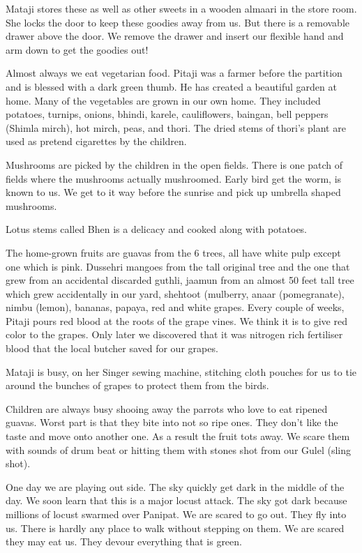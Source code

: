 Mataji stores these as well as other sweets in a wooden almaari in the
store room. She locks the door to keep these goodies away from us. But
there is a removable drawer above the door. We remove the drawer and
insert our flexible hand and arm down to get the goodies out! 

Almost always we eat vegetarian food. Pitaji was a farmer before the
partition and is blessed with a dark green thumb. He has created
a beautiful garden at home. Many of the vegetables are grown in our own
home. They included potatoes, turnips, onions, bhindi, karele,
cauliflowers, baingan, bell peppers (Shimla mirch), hot mirch, peas, and
thori. The dried stems of thori’s plant are used as pretend cigarettes by
the children. 

Mushrooms are picked by the children in the open fields. There is one
patch of fields where the mushrooms actually mushroomed. Early bird get
the worm, is known to us. We get to it way before the sunrise and pick up
umbrella shaped mushrooms. 

Lotus stems called Bhen is a delicacy and cooked along with potatoes. 

The home-grown fruits are guavas from the 6 trees, all have white pulp
except one which is pink. Dussehri mangoes from the tall original tree and
the one that grew from an accidental discarded guthli, jaamun from an
almost 50 feet tall tree which grew accidentally in our yard, shehtoot
(mulberry, anaar (pomegranate), nimbu (lemon), bananas, papaya, red and
white grapes. Every couple of weeks, Pitaji pours red blood at the roots
of the grape vines. We think it is to give red color to the grapes. Only
later we discovered that it was nitrogen rich fertiliser blood that the
local butcher saved for our grapes. 

Mataji is busy, on her Singer sewing machine, stitching cloth pouches for
us to tie around the bunches of grapes to protect them from the birds. 

Children are always busy shooing away the parrots who love to eat ripened
guavas. Worst part is that they bite into not so ripe ones. They don’t
like the taste and move onto another one. As a result the fruit tots away.
We scare them with sounds of drum beat or hitting them with stones shot
from our Gulel (sling shot). 

One day we are playing out side. The sky quickly get dark in the middle of
the day. We soon learn that this is a major locust attack. The sky got
dark because millions of locust swarmed over Panipat. We are scared to go
out. They fly into us. There is hardly any place to walk without stepping
on them. We are scared they may eat us. They devour everything that is
green. 


